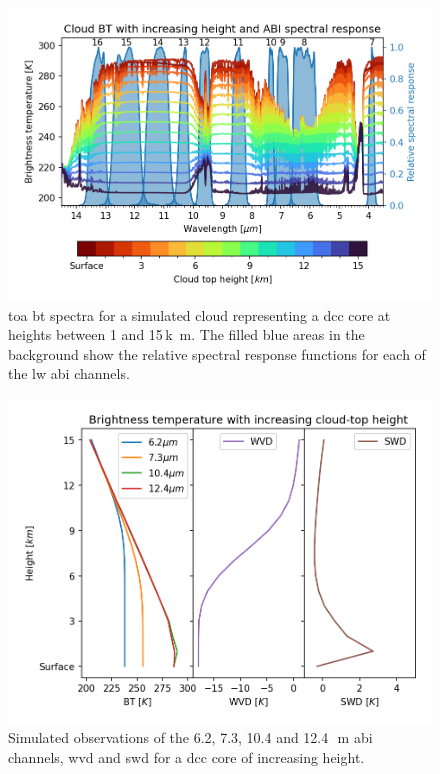 \begin{figure}[t]
    \includegraphics[width=\textwidth]{figures/chapter1_05.png}
    \caption[
    \acrshort{toa} \acrshort{bt} spectra for a simulated cloud representing a \acrshort{dcc} core at heights between 1 and 15\,\unit{k m}
    ]{
    \acrshort{toa} \acrshort{bt} spectra for a simulated cloud representing a \acrshort{dcc} core at heights between 1 and 15\,\unit{k m}. The filled blue areas in the background show the relative spectral response functions for each of the \acrshort{lw} \acrshort{abi} channels.
    }
    \label{fig:cloud_height_spectra}
\end{figure}

\begin{figure}[t]
    \includegraphics[width=\textwidth]{figures/chapter1_06.png}
    \caption[
    Simulated observations of the 6.2, 7.3, 10.4 and 12.4\,\unit{\mu m} \acrshort{abi} channels, \acrshort{wvd} and \acrshort{swd} for a \acrshort{dcc} core of increasing height
    ]{
    Simulated observations of the 6.2, 7.3, 10.4 and 12.4\,\unit{\mu m} \acrshort{abi} channels, \acrshort{wvd} and \acrshort{swd} for a \acrshort{dcc} core of increasing height.
    }
    \label{fig:cloud_height_channels}
\end{figure}

